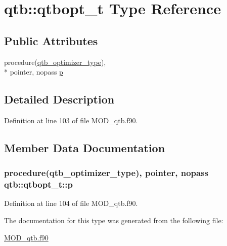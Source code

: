 \hypertarget{structqtb_1_1qtbopt__t}{\section{qtb\-:\-:qtbopt\-\_\-t Type Reference}
\label{structqtb_1_1qtbopt__t}
}
\subsection*{Public Attributes}
\begin{DoxyCompactItemize}
\item 
procedure(\hyperlink{interfaceqtb_1_1qtb__optimizer__type}{qtb\-\_\-optimizer\-\_\-type}), \\*
pointer, nopass \hyperlink{structqtb_1_1qtbopt__t_a2ce349c73d54b7cb9c0c099fb1f82156}{p}
\end{DoxyCompactItemize}


\subsection{Detailed Description}


Definition at line 103 of file M\-O\-D\-\_\-qtb.\-f90.



\subsection{Member Data Documentation}
\hypertarget{structqtb_1_1qtbopt__t_a2ce349c73d54b7cb9c0c099fb1f82156}{
\subsubsection[{p}]{\setlength{\rightskip}{0pt plus 5cm}procedure({\bf qtb\-\_\-optimizer\-\_\-type}), pointer, nopass qtb\-::qtbopt\-\_\-t\-::p}}\label{structqtb_1_1qtbopt__t_a2ce349c73d54b7cb9c0c099fb1f82156}


Definition at line 104 of file M\-O\-D\-\_\-qtb.\-f90.



The documentation for this type was generated from the following file\-:\begin{DoxyCompactItemize}
\item 
\hyperlink{MOD__qtb_8f90}{M\-O\-D\-\_\-qtb.\-f90}\end{DoxyCompactItemize}
